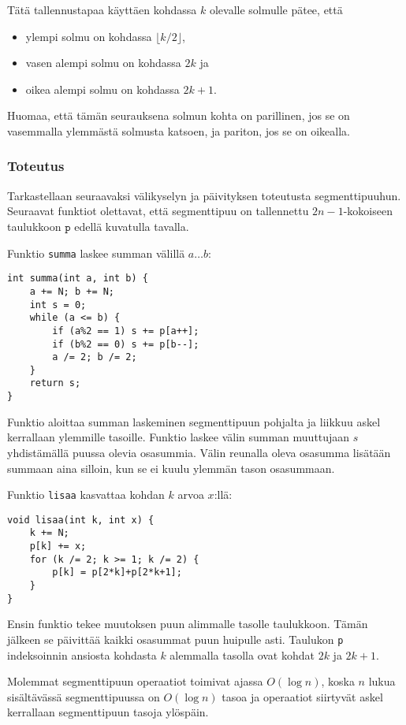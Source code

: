 Tätä tallennustapaa käyttäen kohdassa $k$
olevalle solmulle pätee, että
\begin{itemize}
\item ylempi solmu on kohdassa $\lfloor k/2 \rfloor$,
\item vasen alempi solmu on kohdassa $2k$ ja
\item oikea alempi solmu on kohdassa $2k+1$.
\end{itemize}
Huomaa, että tämän seurauksena solmun kohta on parillinen,
jos se on vasemmalla ylemmästä solmusta katsoen,
ja pariton, jos se on oikealla.

\subsubsection{Toteutus}

Tarkastellaan seuraavaksi välikyselyn ja päivityksen
toteutusta segmenttipuuhun.
Seuraavat funktiot olettavat, että segmenttipuu
on tallennettu $2n-1$-kokoi\-seen taulukkoon $\texttt{p}$
edellä kuvatulla tavalla.

Funktio \texttt{summa} laskee summan
välillä $a \ldots b$:

\begin{lstlisting}
int summa(int a, int b) {
    a += N; b += N;
    int s = 0;
    while (a <= b) {
        if (a%2 == 1) s += p[a++];
        if (b%2 == 0) s += p[b--];
        a /= 2; b /= 2;
    }
    return s;
}
\end{lstlisting}

Funktio aloittaa summan laskeminen segmenttipuun
pohjalta ja liikkuu askel kerrallaan ylemmille tasoille.
Funktio laskee välin summan muuttujaan $s$
yhdistämällä puussa olevia osasummia.
Välin reunalla oleva osasumma lisätään summaan
aina silloin, kun se ei kuulu ylemmän tason osasummaan.

Funktio \texttt{lisaa} kasvattaa kohdan $k$ arvoa $x$:llä:

\begin{lstlisting}
void lisaa(int k, int x) {
    k += N;
    p[k] += x;
    for (k /= 2; k >= 1; k /= 2) {
        p[k] = p[2*k]+p[2*k+1];
    }
}
\end{lstlisting}
Ensin funktio tekee muutoksen puun alimmalle
tasolle taulukkoon.
Tämän jälkeen se päivittää kaikki osasummat
puun huipulle asti.
Taulukon \texttt{p} indeksoinnin ansiosta
kohdasta $k$ alemmalla tasolla
ovat kohdat $2k$ ja $2k+1$.

Molemmat segmenttipuun operaatiot toimivat ajassa
$O(\log n)$, koska $n$ lukua sisältävässä
segmenttipuussa on $O(\log n)$ tasoa
ja operaatiot siirtyvät askel kerrallaan
segmenttipuun tasoja ylöspäin.


